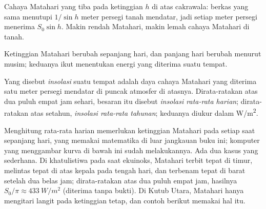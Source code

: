 \begin{omfigure}

{\small Cahaya Matahari yang tiba pada ketinggian $h$ di atas cakrawala:
berkas yang sama menutupi $1/\sin h$ meter persegi tanah mendatar, jadi setiap
meter persegi menerima $S_0 \sin h$. Makin rendah Matahari, makin lemah cahaya
Matahari di tanah.}
\end{omfigure}

Ketinggian Matahari berubah sepanjang hari, dan panjang hari berubah menurut
musim; keduanya ikut menentukan energi yang diterima suatu tempat.

\begin{definition}[Insolasi]\label{def:g10:earth-energy-budget:insolation}
Yang disebut \emph{insolasi} suatu tempat adalah daya cahaya
Matahari yang diterima satu meter persegi mendatar di puncak atmosfer di
atasnya. Dirata-ratakan atas dua puluh empat jam sehari, besaran itu disebut
\emph{insolasi rata-rata harian}; dirata-ratakan atas setahun, \emph{insolasi
rata-rata tahunan}; keduanya diukur dalam \unit{W/m^2}.
\end{definition}

Menghitung rata-rata harian memerlukan ketinggian Matahari pada setiap saat
sepanjang hari, yang memakai matematika di luar jangkauan buku ini; komputer
yang menggambar kurva di bawah ini sudah melakukannya. Ada dua kasus yang
sederhana. Di khatulistiwa pada saat ekuinoks, Matahari terbit tepat di timur,
melintas tepat di atas kepala pada tengah hari, dan terbenam tepat di barat
setelah dua belas jam; dirata-ratakan atas dua puluh empat jam, hasilnya
$S_0/\pi \approx \qty{433}{W/m^2}$ (diterima tanpa bukti). Di Kutub Utara,
Matahari hanya mengitari langit pada ketinggian tetap, dan contoh berikut
memakai hal itu.

